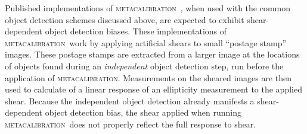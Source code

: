 \documentclass[iop, twocolappendix, appendixfloats, numberedappendix, apj]{hackemulateapj}
\newcommand{\mcal}{\textsc{metacalibration}}
\begin{document}
Published implementations of \mcal\
\citep[e.g.,][]{HuffMcal2017,SheldonMcal2017}, when used with the common object
detection schemes discussed above, are expected to exhibit shear-dependent
object detection biases. These implementations of \mcal\ work by applying
artificial shears to small ``postage stamp'' images. These postage stamps are
extracted from a larger image at the locations of objects found during an {\em
independent} object detection step, run before the application of \mcal.
Measurements on the sheared images are then used to calculate of a linear
response of an ellipticity measurement to the applied shear. Because the
independent object detection already manifests a shear-dependent object
detection bias, the shear applied when running \mcal\ does not properly reflect
the full response to shear.

\end{document}
